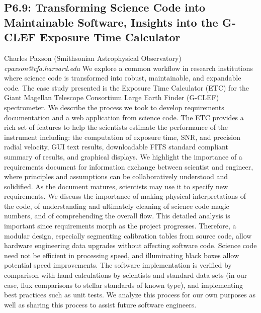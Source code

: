 \documentclass{report}
\begin{document}
\subsection*{P6.9: Transforming Science Code into Maintainable Software, Insights into the G-CLEF Exposure Time Calculator}
\bigskip
Charles Paxson (Smithsonian Astrophysical Observatory) \newline   \newline   \newline   \newline  \newline  \newline\newline
{\it cpaxson@cfa.harvard.edu}\newline
\newline\newline
We explore a common workflow in research institutions where science code is transformed into robust, maintainable, and expandable code. The case study presented is the Exposure Time Calculator (ETC) for the Giant Magellan Telescope Consortium Large Earth Finder (G-CLEF) spectrometer.  We describe the process we took to develop requirements documentation and a web application from science code.  The ETC provides a rich set of features to help the scientists estimate the performance of the instrument including: the computation of exposure time, SNR, and precision radial velocity, GUI text results, downloadable FITS standard compliant summary of results, and graphical displays.  We highlight the importance of a requirements document for information exchange between scientist and engineer, where principles and assumptions can be collaboratively understood and solidified.  As the document matures, scientists may use it to specify new requirements.  We discuss the importance of making physical interpretations of the code, of understanding and ultimately cleaning of science code magic numbers, and of comprehending the overall flow.   This detailed analysis is important since requirements morph as the project progresses.  Therefore, a modular design, especially segmenting calibration tables from source code, allow hardware engineering data upgrades without affecting software code.  Science code need not be efficient in processing speed, and illuminating black boxes allow potential speed improvements.  The software implementation is verified by comparison with hand calculations by scientists and standard data sets (in our case, flux comparisons to stellar standards of known type), and implementing best practices such as unit tests.  We analyze this process for our own purposes as well as sharing this process to assist future software engineers.\newline
\newpage
\end{document}
